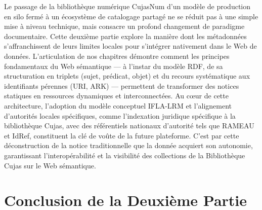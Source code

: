 \documentclass[12pt,twoside]{book}
\begin{document}
Le passage de la bibliothèque numérique CujasNum d'un modèle de production en silo fermé à un écosystème de catalogage partagé ne se réduit pas à une simple mise à niveau technique, mais consacre un profond changement de paradigme documentaire. Cette deuxième partie explore la manière dont les métadonnées s'affranchissent de leurs limites locales pour s'intégrer nativement dans le Web de données. L'articulation de nos chapitres démontre comment les principes fondamentaux du Web sémantique — à l'instar du modèle \ac{RDF}, de sa structuration en triplets (sujet, prédicat, objet) et du recours systématique aux identifiants pérennes (\ac{URI}, \ac{ARK}) — permettent de transformer des notices statiques en ressources dynamiques et interconnectées. Au cœur de cette architecture, l'adoption du modèle conceptuel \ac{IFLA-LRM} et l'alignement d'autorités locales spécifiques, comme l'indexation juridique spécifique à la bibliothèque Cujas, avec des référentiels nationaux d'autorité tels que \ac{RAMEAU} et IdRef, constituent la clé de voûte de la future plateforme. C'est par cette déconstruction de la notice traditionnelle que la donnée acquiert son autonomie, garantissant l'interopérabilité et la visibilité des collections de la Bibliothèque Cujas sur le Web sémantique.






\section*{Conclusion de la Deuxième Partie}
\end{document}
